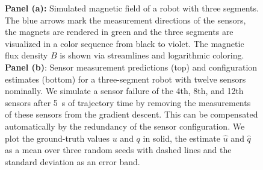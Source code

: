 \begin{figure}[hbt]
\centering
\caption{\textbf{Panel (a):} Simulated magnetic field of a robot with three segments. The blue arrows mark the measurement directions of the sensors, the magnets are rendered in green and the three segments are visualized in a color sequence from black to violet. The magnetic flux density $B$ is shown via streamlines and logarithmic coloring. \textbf{Panel (b)}: Sensor measurement predictions (top) and configuration estimates (bottom) for a three-segment robot with twelve sensors nominally. We simulate a sensor failure of the 4th, 8th, and 12th sensors after \SI{5}{s} of trajectory time by removing the measurements of these sensors from the gradient descent. This can be compensated automatically by the redundancy of the sensor configuration. We plot the ground-truth values $u$ and $q$ in solid, the estimate $\hat{u}$ and $\hat{q}$ as a mean over three random seeds with dashed lines and the standard deviation as an error band.}
\end{figure}

